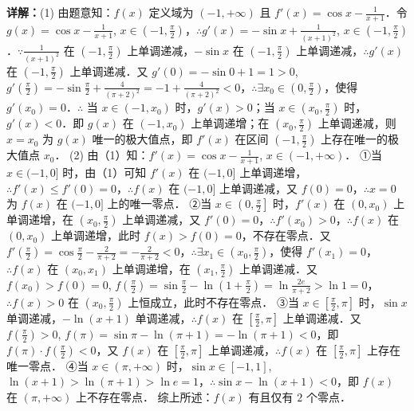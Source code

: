 \begin{question}[points=12]
\begin{solution}
\textbf{详解：}(1) 由题意知：$f(x)$ 定义域为 $(-1, +\infty)$ 且 $f'(x) = \cos x - \frac{1}{x+1}$．令 $g(x) = \cos x - \frac{1}{x+1}$, $x \in \left(-1, \frac{\pi}{2}\right)$，$\therefore g'(x) = -\sin x + \frac{1}{(x+1)^2}$, $x \in \left(-1, \frac{\pi}{2}\right)$．$\because \frac{1}{(x+1)^2}$ 在 $\left(-1, \frac{\pi}{2}\right)$ 上单调递减，$-\sin x$ 在 $\left(-1, \frac{\pi}{2}\right)$ 上单调递减，$\therefore g'(x)$ 在 $\left(-1, \frac{\pi}{2}\right)$ 上单调递减．又 $g'(0) = -\sin 0 + 1 = 1 > 0$, $g'\left(\frac{\pi}{2}\right) = -\sin\frac{\pi}{2} + \frac{4}{(\pi+2)^2} = -1 + \frac{4}{(\pi+2)^2} < 0$，$\therefore \exists x_0 \in \left(0, \frac{\pi}{2}\right)$，使得 $g'(x_0) = 0$．$\therefore$ 当 $x \in (-1, x_0)$ 时，$g'(x) > 0$；当 $x \in \left(x_0, \frac{\pi}{2}\right)$ 时，$g'(x) < 0$．即 $g(x)$ 在 $(-1, x_0)$ 上单调递增；在 $\left(x_0, \frac{\pi}{2}\right)$ 上单调递减，则 $x = x_0$ 为 $g(x)$ 唯一的极大值点，即 $f'(x)$ 在区间 $\left(-1, \frac{\pi}{2}\right)$ 上存在唯一的极大值点 $x_0$．
(2) 由（1）知：$f'(x) = \cos x - \frac{1}{x+1}$, $x \in (-1, +\infty)$．
①当 $x \in (-1, 0]$ 时，由（1）可知 $f'(x)$ 在 $(-1, 0]$ 上单调递增，$\therefore f'(x) \le f'(0) = 0$，$\therefore f(x)$ 在 $(-1, 0]$ 上单调递减，又 $f(0) = 0$，$\therefore x = 0$ 为 $f(x)$ 在 $(-1, 0]$ 上的唯一零点．
②当 $x \in \left(0, \frac{\pi}{2}\right]$ 时，$f'(x)$ 在 $(0, x_0)$ 上单调递增，在 $\left(x_0, \frac{\pi}{2}\right)$ 上单调递减，又 $f'(0) = 0$，$\therefore f'(x_0) > 0$，$\therefore f(x)$ 在 $(0, x_0)$ 上单调递增，此时 $f(x) > f(0) = 0$，不存在零点．又 $f'\left(\frac{\pi}{2}\right) = \cos\frac{\pi}{2} - \frac{2}{\pi+2} = -\frac{2}{\pi+2} < 0$，$\therefore \exists x_1 \in \left(x_0, \frac{\pi}{2}\right)$，使得 $f'(x_1) = 0$，$\therefore f(x)$ 在 $(x_0, x_1)$ 上单调递增，在 $\left(x_1, \frac{\pi}{2}\right)$ 上单调递减．又 $f(x_0) > f(0) = 0$, $f\left(\frac{\pi}{2}\right) = \sin\frac{\pi}{2} - \ln\left(1 + \frac{\pi}{2}\right) = \ln\frac{2e}{\pi+2} > \ln 1 = 0$，$\therefore f(x) > 0$ 在 $\left(x_0, \frac{\pi}{2}\right)$ 上恒成立，此时不存在零点．
③当 $x \in \left[\frac{\pi}{2}, \pi\right]$ 时，$\sin x$ 单调递减，$-\ln(x+1)$ 单调递减，$\therefore f(x)$ 在 $\left[\frac{\pi}{2}, \pi\right]$ 上单调递减．又 $f\left(\frac{\pi}{2}\right) > 0$, $f(\pi) = \sin\pi - \ln(\pi+1) = -\ln(\pi+1) < 0$，即 $f(\pi) \cdot f\left(\frac{\pi}{2}\right) < 0$，又 $f(x)$ 在 $\left[\frac{\pi}{2}, \pi\right]$ 上单调递减，$\therefore f(x)$ 在 $\left[\frac{\pi}{2}, \pi\right]$ 上存在唯一零点．
④当 $x \in (\pi, +\infty)$ 时，$\sin x \in [-1, 1]$, $\ln(x+1) > \ln(\pi+1) > \ln e = 1$，$\therefore \sin x - \ln(x+1) < 0$，即 $f(x)$ 在 $(\pi, +\infty)$ 上不存在零点．
综上所述：$f(x)$ 有且仅有 $2$ 个零点．
\end{solution}
\end{question}


